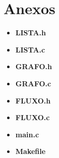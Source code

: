 \documentclass[
    12pt,               %
    a4paper,            %
    oneside,
    english,            %
    french,             %
    spanish,            %
    brazil              %
    ]{abntex2}
\begin{document}
\chapter*{Anexos}
\begin{itemize}
\item \textbf{LISTA.h}
\item \textbf{LISTA.c}
\item \textbf{GRAFO.h}
\item \textbf{GRAFO.c}
\item \textbf{FLUXO.h}
\item \textbf{FLUXO.c}
\item \textbf{main.c}
\item \textbf{Makefile}
\end{itemize}
\end{document}
